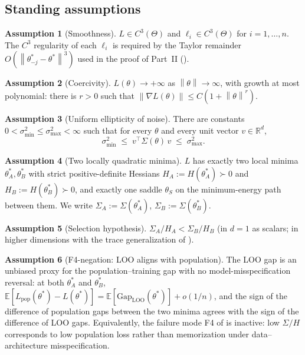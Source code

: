 \documentclass[11pt,a4paper]{article}
\theoremstyle{definition}
\newtheorem{assumption}{Assumption}
\theoremstyle{remark}
\newcommand{\R}{\mathbb{R}}
\newcommand{\E}{\mathbb{E}}
\newcommand{\Gap}{\mathrm{Gap}}
\newcommand{\LOO}{\mathrm{LOO}}
\newcommand{\norm}[1]{\left\|#1\right\|}
\begin{document}
\subsection{Standing assumptions}

\begin{assumption}[Smoothness]\label{A:C2}
   $L\in C^3(\Theta)$ and $\ell_i\in C^3(\Theta)$ for $i=1,\dots,n$.
   The $C^3$ regularity of each $\ell_i$ is required by the Taylor remainder
   $O(\norm{\theta^*_{-j}-\theta^*}^3)$ used in the proof of Part~II
   ().
\end{assumption}

\begin{assumption}[Coercivity]\label{A:coerc}
   $L(\theta)\to+\infty$ as $\norm{\theta}\to\infty$, with growth at most
   polynomial: there is $r>0$ such that $\norm{\nabla L(\theta)}
   \leq C(1+\norm{\theta}^r)$.
\end{assumption}

\begin{assumption}[Uniform ellipticity of noise]\label{A:ellip}
   There are constants $0 < \sigma_{\min}^2 \leq \sigma_{\max}^2 < \infty$
   such that for every $\theta$ and every unit vector $v\in\R^d$,
   \[
      \sigma_{\min}^2 \;\leq\; v^{\!\top}\Sigma(\theta)\,v
                    \;\leq\; \sigma_{\max}^2.
   \]
\end{assumption}

\begin{assumption}[Two locally quadratic minima]\label{A:two-wells}
   $L$ has exactly two local minima $\theta_A^*,\theta_B^*$ with strict
   positive-definite Hessians $H_A:=H(\theta_A^*)\succ 0$ and
   $H_B:=H(\theta_B^*)\succ 0$, and exactly one saddle $\theta_S$ on the
   minimum-energy path between them.  We write
   $\Sigma_A:=\Sigma(\theta_A^*)$, $\Sigma_B:=\Sigma(\theta_B^*)$.
\end{assumption}

\begin{assumption}[Selection hypothesis]\label{A:sel}
   $\Sigma_A/H_A < \Sigma_B/H_B$ (in $d=1$ as scalars; in higher dimensions
   with the trace generalization of ).
\end{assumption}

\begin{assumption}[F4-negation: LOO aligns with population]\label{A:F4-neg}
   The LOO gap is an unbiased proxy for the population--training gap with
   no model-misspecification reversal: at both $\theta_A^*$ and $\theta_B^*$,
   $\E[L_{\mathrm{pop}}(\theta^*) - L(\theta^*)] = \E[\Gap_{\LOO}(\theta^*)]
                                                          + o(1/n)$,
   and the sign of the difference of population gaps between the two
   minima agrees with the sign of the difference of LOO gaps.
   Equivalently, the failure mode F4 of \cite{paperB} is inactive: low
   $\Sigma/H$ corresponds to low population loss rather than memorization
   under data--architecture misspecification.
\end{assumption}
\end{document}
